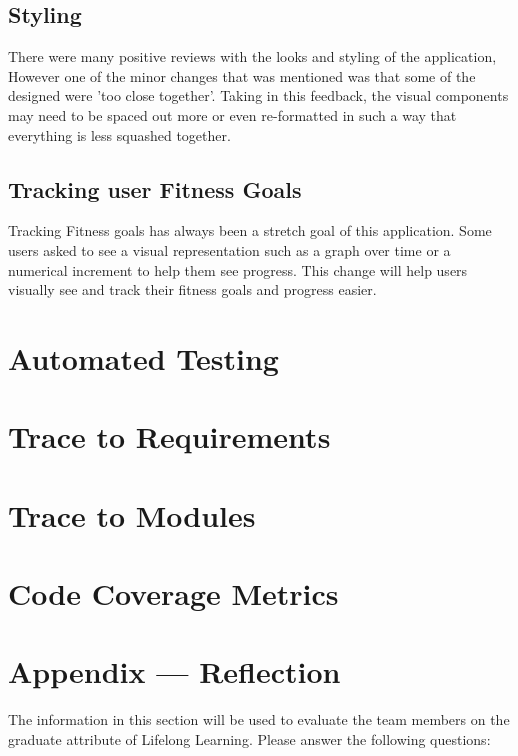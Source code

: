\documentclass[12pt, titlepage]{article}
\begin{document}
\subsection{Styling}
There were many positive reviews with the looks and styling of the application, However one of the minor changes that was mentioned was that some of the designed were 'too close together'. Taking in this feedback, the visual components may need to be spaced out more or even re-formatted in such a way that everything is less squashed together.
\subsection{Tracking user Fitness Goals}
Tracking Fitness goals  has always been a stretch goal of this application. Some users asked to see a visual representation such as a graph over time or a numerical increment to help them see progress. This change will help users visually see and track their fitness goals and progress easier.

\section{Automated Testing}
		
\section{Trace to Requirements}
		
\section{Trace to Modules}		

\section{Code Coverage Metrics}




\newpage{}
\section*{Appendix --- Reflection}

The information in this section will be used to evaluate the team members on the
graduate attribute of Lifelong Learning.  Please answer the following questions:
\end{document}
